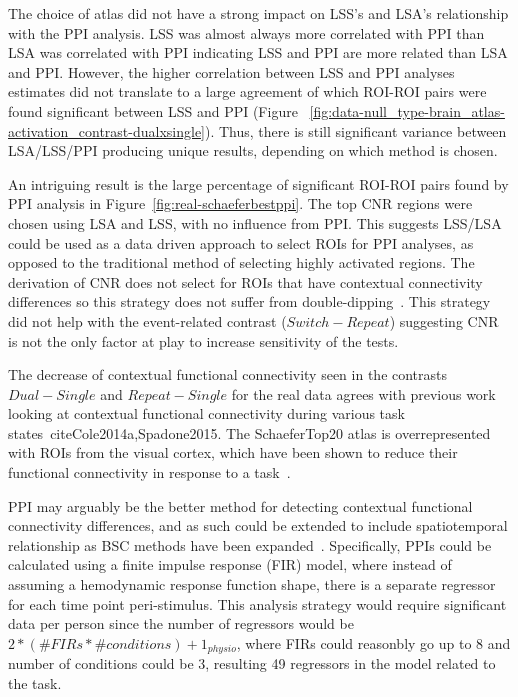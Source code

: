\documentclass[phd,appendix,figures]{uithesis}
\begin{document}
The choice of atlas did not have a strong impact on LSS's and LSA's relationship with
the PPI analysis.
LSS was almost always more correlated with PPI than LSA was correlated with PPI indicating
LSS and PPI are more related than LSA and PPI.
However, the higher correlation between LSS and PPI analyses estimates
did not translate to a large agreement of which ROI-ROI pairs were found
significant between LSS and PPI (Figure ~\ref{fig:data-null_type-brain_atlas-activation_contrast-dualxsingle}).
Thus, there is still significant variance between LSA/LSS/PPI producing unique results,
depending on which method is chosen.

An intriguing result is the large percentage of significant ROI-ROI pairs found by
PPI analysis in Figure~\ref{fig:real-schaeferbestppi}.
The top CNR regions were chosen using LSA and LSS, with no influence from PPI.
This suggests LSS/LSA could be used as a data driven approach to select ROIs
for PPI analyses, as opposed to the traditional method of selecting
highly activated regions.
The derivation of CNR does not select for ROIs that have contextual
connectivity differences so this strategy does not suffer from
double-dipping~\cite{Kriegeskorte2009}.
This strategy did not help with the event-related contrast ($Switch - Repeat$)
suggesting CNR is not the only factor at play to increase sensitivity of
the tests.

The decrease of contextual functional connectivity seen in the contrasts
$Dual - Single$ and $Repeat - Single$ for the real data agrees with previous
work looking at contextual functional connectivity during various task states~cite{Cole2014a,Spadone2015}.
The SchaeferTop20 atlas is overrepresented with ROIs from the visual cortex, which have been shown
to reduce their functional connectivity in response to a task~\cite{Spadone2015}.

PPI may arguably be the better method for detecting contextual functional connectivity
differences, and as such could be extended to include spatiotemporal relationship as BSC methods
have been expanded~\cite{Turner2012a}.
Specifically, PPIs could be calculated using a finite impulse response (FIR) model, where instead of assuming
a hemodynamic response function shape, there is a separate regressor for each time point peri-stimulus.
This analysis strategy would require significant data per person since the number of regressors would be
$2 * (\#FIRs * \#conditions) + 1_{physio}$, where FIRs could reasonbly go up to 8 and number of conditions could
be 3, resulting 49 regressors in the model related to the task.
\end{document}
